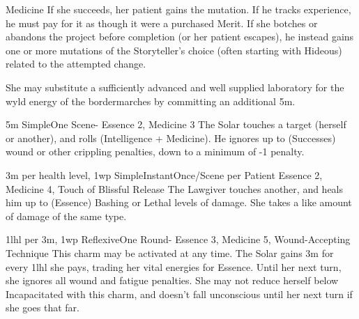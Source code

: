 \begin{Ability}{Medicine}
  If she succeeds, her patient gains the mutation. If he tracks experience, he must pay for it as though it were a purchased Merit. If she botches or abandons the project before completion (or her patient escapes), he instead gains one or more mutations of the Storyteller's choice (often starting with Hideous) related to the attempted change.

  She may substitute a sufficiently advanced and well supplied laboratory for the wyld energy of the bordermarches by committing an additional 5m.

  {5m}
  {Simple}{One Scene}{-}
  {Essence 2, Medicine 3}
  The Solar touches a target (herself or another), and rolls (Intelligence + Medicine). He ignores up to (Successes) wound or other crippling penalties, down to a minimum of -1 penalty.

  {3m per health level, 1wp}
  {Simple}{Instant}{Once/Scene per Patient}
  {Essence 2, Medicine 4, Touch of Blissful Release}
  The Lawgiver touches another, and heals him up to (Essence) Bashing or Lethal levels of damage. She takes a like amount of damage of the same type.

  {1lhl per 3m, 1wp}
  {Reflexive}{One Round}{-}
  {Essence 3, Medicine 5, Wound-Accepting Technique}
  This charm may be activated at any time. The Solar gains 3m for every 1lhl she pays, trading her vital energies for Essence. Until her next turn, she ignores all wound and fatigue penalties. She may not reduce herself below Incapacitated with this charm, and doesn't fall unconscious until her next turn if she goes that far.

\end{Ability}

